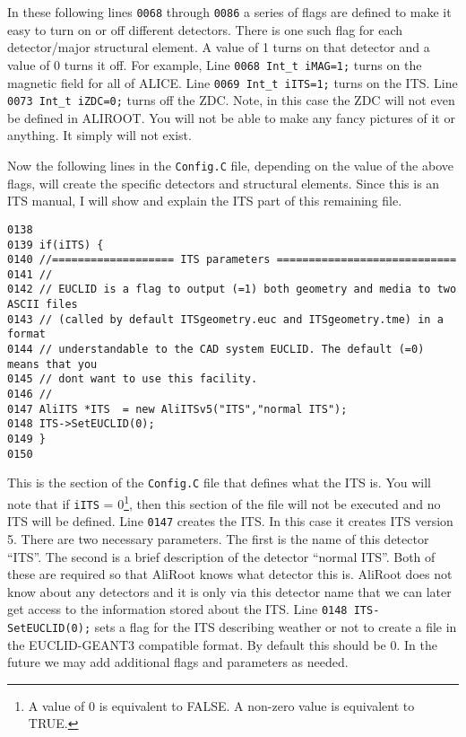 In these following lines \texttt{0068} through \texttt{0086} a series of flags
are defined to make it easy to turn on or off different detectors. There is one
such flag for each detector/major structural element. A value of 1 turns on
that detector and a value of 0 turns it off. For example, Line 
\texttt{0068 Int\_t iMAG=1;} turns on the magnetic field for all of 
ALICE\footnotemark. Line \texttt{0069 Int\_t iITS=1;} turns on the ITS. Line
\texttt{0073 Int\_t iZDC=0;} turns off the ZDC\footnotemark. Note, in this
case the ZDC will not even be defined in ALIROOT. You will not be able to make
any fancy pictures of it or anything. It simply will not exist.

\addtocounter{footnote}{-1}

\addtocounter{footnote}{1}

Now the following lines in the \texttt{Config.C} file, depending on the value
of the above flags, will create the specific detectors and structural
elements. Since this is an ITS manual, I will show and explain the ITS part of
this remaining file.

\scriptsize
\begin{verbatim}
0138
0139 if(iITS) {
0140 //=================== ITS parameters ============================
0141 //
0142 // EUCLID is a flag to output (=1) both geometry and media to two ASCII files 
0143 // (called by default ITSgeometry.euc and ITSgeometry.tme) in a format
0144 // understandable to the CAD system EUCLID. The default (=0) means that you 
0145 // dont want to use this facility.
0146 //
0147 AliITS *ITS  = new AliITSv5("ITS","normal ITS");
0148 ITS->SetEUCLID(0);
0149 }
0150 
\end{verbatim}
\normalsize

This is the section of the \texttt{Config.C} file that defines what the ITS
is. You will note that if \texttt{iITS} = 0\footnote{A value of 0 is equivalent
to FALSE. A non-zero value is equivalent to TRUE.}, then this section of the
file will not be executed and no ITS will be defined. Line \texttt{0147}
creates the ITS. In this case it creates ITS version 5. There are two necessary
parameters. The first is the name of this detector ``ITS''. The second is a
brief description of the detector ``normal ITS''. Both of these are required so
that AliRoot knows what detector this is. AliRoot does not know about any
detectors and it is only via this detector name that we can later get access to
the information stored about the ITS. Line \texttt{0148 ITS-SetEUCLID(0);} sets
a flag for the ITS describing weather or not to create a file in the
EUCLID-GEANT3 compatible format. By default this should be 0. In the future we
may add additional flags and parameters as needed.

